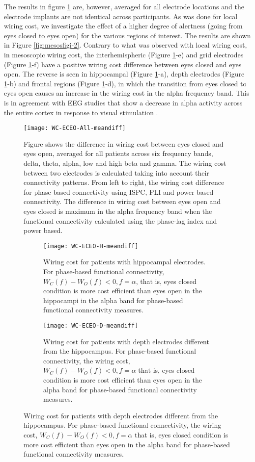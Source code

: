 \documentclass[11pt, onecolumn]{article}
\begin{document}
{The results in figure \ref{fig:mesosfigi-1} are, however, averaged for all electrode locations and the electrode implants are not identical across participants. As was done for local wiring cost, we investigate the effect of a higher degree of alertness (going from eyes closed to eyes open) for the various regions of interest. The results are shown in Figure \ref{fig:mesosfigi-2}. Contrary to what was observed with local wiring cost, in mesoscopic wiring cost, the interhemispheric (Figure \ref{fig:mesosfigi-1}-e) and grid electrodes (Figure \ref{fig:mesosfigi-1}-f) have a positive wiring cost difference between eyes closed and eyes open.
The reverse is seen in hippocampal (Figure \ref{fig:mesosfigi-1}-a), depth electrodes (Figure \ref{fig:mesosfigi-1}-b) and frontal regions (Figure \ref{fig:mesosfigi-1}-d), in which the transition from eyes closed to eyes open causes an increase in the wiring cost in  the alpha frequency band. This is in agreement with EEG studies that show a decrease in alpha activity across the entire cortex in response to visual stimulation \citep{barry2007eeg}.

\begin{figure}[h]
        \centering
        \texttt{[image: WC-ECEO-All-meandiff]}
        \caption{Figure shows the difference in wiring cost between eyes closed and eyes open, averaged for all patients across six frequency bands, delta, theta, alpha, low and high beta and gamma. The wiring cost between two electrodes is calculated taking into account their connectivity patterns. From left to right, the wiring cost difference for phase-based connectivity using ISPC, PLI and power-based connectivity. The difference in wiring cost between eyes open and eyes closed is maximum in the alpha frequency band when the functional connectivity calculated using the phase-lag index and power based.}
        \label{fig:mesosfigi-1}
\end{figure}

\begin{figure}[h] 
  \begin{subfigure}[t]{0.5\linewidth}
    \centering
    \texttt{[image: WC-ECEO-H-meandiff]} 
    \caption{Wiring cost for patients with hippocampal electrodes. For phase-based functional connectivity, $W_C(f) - W_O(f) <0, f = \alpha$, that is, eyes closed condition is more cost efficient than eyes open in the hippocampi in the alpha band for phase-based functional connectivity measures.} 
    \label{mesosfigi-2:a} 
  \end{subfigure}%
  \hspace{1ex}
  \begin{subfigure}[t]{0.5\linewidth}
    \centering
    \texttt{[image: WC-ECEO-D-meandiff]} 
    \caption{Wiring cost for patients with depth electrodes different from the hippocampus. For phase-based functional connectivity, the wiring cost, $W_C(f) - W_O(f) <0, f = \alpha$ that is, eyes closed condition is more cost efficient than eyes open in the alpha band for phase-based functional connectivity measures.} 
    \label{mesosfigi-2:b} 
  \end{subfigure} 
  

\end{figure}}
\end{document}
